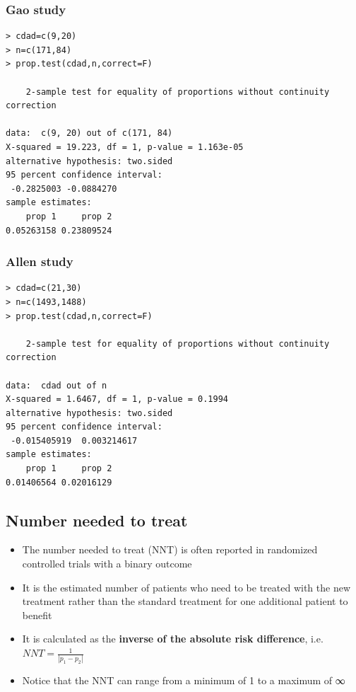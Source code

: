 \documentclass[
]{book}
\providecommand{\tightlist}{%
  \setlength{\itemsep}{0pt}\setlength{\parskip}{0pt}}
\begin{document}
\hypertarget{gao-study}{%
\subsubsection{Gao study}\label{gao-study}}

\begin{verbatim}
> cdad=c(9,20)
> n=c(171,84)
> prop.test(cdad,n,correct=F)

    2-sample test for equality of proportions without continuity correction

data:  c(9, 20) out of c(171, 84)
X-squared = 19.223, df = 1, p-value = 1.163e-05
alternative hypothesis: two.sided
95 percent confidence interval:
 -0.2825003 -0.0884270
sample estimates:
    prop 1     prop 2 
0.05263158 0.23809524
\end{verbatim}

\hypertarget{allen-study}{%
\subsubsection{Allen study}\label{allen-study}}

\begin{verbatim}
> cdad=c(21,30)
> n=c(1493,1488)
> prop.test(cdad,n,correct=F)

    2-sample test for equality of proportions without continuity correction

data:  cdad out of n
X-squared = 1.6467, df = 1, p-value = 0.1994
alternative hypothesis: two.sided
95 percent confidence interval:
 -0.015405919  0.003214617
sample estimates:
    prop 1     prop 2 
0.01406564 0.02016129 
\end{verbatim}

\hypertarget{number-needed-to-treat}{%
\subsection{Number needed to treat}\label{number-needed-to-treat}}

\begin{itemize}
\tightlist
\item
  The number needed to treat (NNT) is often reported in randomized controlled trials with a binary outcome
\item
  It is the estimated number of patients who need to be treated with the new treatment rather than the standard treatment for one additional patient to benefit
\item
  It is calculated as the \textbf{inverse of the absolute risk difference}, i.e.~\(NNT=\frac{1}{|p_1-p_2|}\)
\item
  Notice that the NNT can range from a minimum of 1 to a maximum of ∞
\end{itemize}
\end{document}
